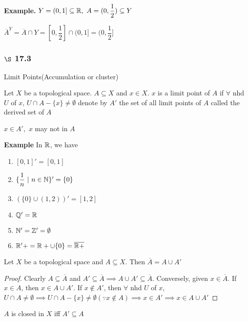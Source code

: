 \textbf{Example.} $Y = (0,1] \subseteq \mathbb{R},~ A = (0,\dfrac{1}{2}) \subseteq Y$

$\overline{A}^Y = \overline{A} \cap Y = [0,\dfrac{1}{2}] \cap (0,1] = (0,\dfrac{1}{2}]$

\subsubsection*{$\S$ 17.3} Limit Points(Accumulation or cluster)

\begin{defn}
	Let $X$ be a topological space. $A \subseteq X$ and $x \in X$. $x$ is a limit point of $A$ if $\forall$ nhd $U$ of $x$, $U \cap A - \{x\} \neq \emptyset$ denote by $A'$ the set of all limit points of $A$ called the derived set of $A$
\end{defn}

\begin{rmk*}
	$x \in A'$,~$x$ may not in $A$
\end{rmk*}

\textbf{Example} In $\mathbb{R}$, we have

\begin{enumerate}[label = $\bullet$]
	\item $[0,1]' = [0,1]$
	\item $\{\dfrac{1}{n}~|~ n \in \mathbb{N}\}' = \{0\}$
	\item $(\{0\} \cup(1,2))' = [1,2]$
	\item $\mathbb{Q}' = \mathbb{R}$
	\item $\mathbb{N}' = \mathbb{Z}' = \emptyset$
	\item $\mathbb{R}'+ = \mathbb{R}+ \cup \{0\} = \overline{\mathbb{R}+}$
\end{enumerate}

\begin{thm*}[17.6]
	Let $X$ be a topological space and $A \subseteq X$. Then $\overline{A} = A \cup A'$
\end{thm*}

\begin{proof}
	Clearly $A \subseteq \overline{A}$ and $A' \subseteq \overline{A} \implies A \cup A' \subseteq \overline{A}$. Conversely, given $x \in \overline{A}$. If $x \in A$, then $x \in A \cup A'$. If $x \notin A'$, then $\forall$ nhd $U$ of $x$, $U \cap A \neq \emptyset \implies U \cap A - \{x\} \neq \emptyset (\because x \notin A) \implies x \in A' \implies x \in A \cup A'$ 
\end{proof}

\begin{cor*}
	$A$ is closed in $X$ iff $A' \subseteq A$
\end{cor*}

